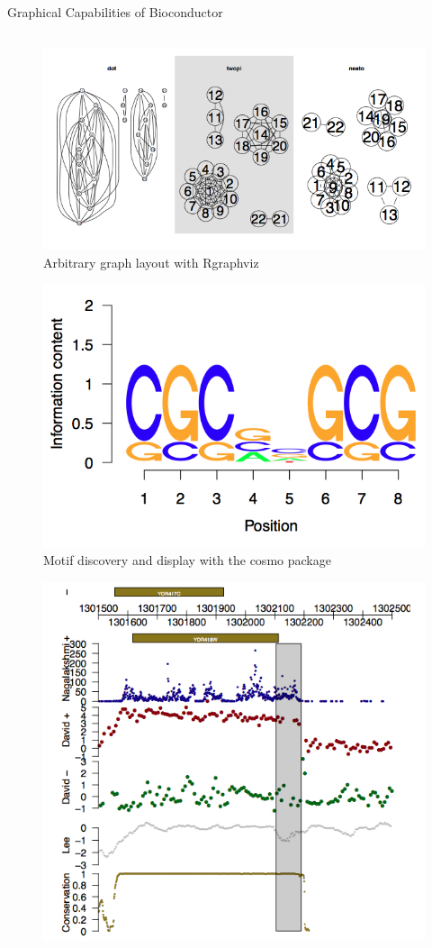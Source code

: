 \documentclass[final]{beamer}
\begin{document}
\begin{frame}[t]
\begin{columns}[t]
\begin{column}{0.48\linewidth}
\begin{block}{Graphical Capabilities of Bioconductor}
\begin{columns}[t]
          \begin{column}{0.33\linewidth}
            \begin{figure}
              \centering
              \includegraphics[width=0.85\linewidth]{rgraphviz}
              \caption{Arbitrary graph layout with Rgraphviz}
            \end{figure}
            \begin{figure}
              \centering
              \includegraphics[width=0.85\linewidth]{cosmo}
              \caption{Motif discovery and display with the cosmo package}
            \end{figure}
            \begin{figure}
              \centering
              \includegraphics[width=0.85\linewidth]{genomegraphs}

\end{figure}
\end{column}
\end{columns}
\end{block}
\end{column}
\end{columns}
\end{frame}
\end{document}
